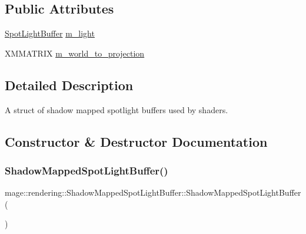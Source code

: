 \subsection*{Public Attributes}
\begin{DoxyCompactItemize}
\item 
\hyperlink{structmage_1_1rendering_1_1_spot_light_buffer}{Spot\+Light\+Buffer} \hyperlink{structmage_1_1rendering_1_1_shadow_mapped_spot_light_buffer_a1df0d45520394b125e77b806f1b6265d}{m\+\_\+light}
\item 
X\+M\+M\+A\+T\+R\+IX \hyperlink{structmage_1_1rendering_1_1_shadow_mapped_spot_light_buffer_abb736c590c4a6efff217e15ef8abec4a}{m\+\_\+world\+\_\+to\+\_\+projection}
\end{DoxyCompactItemize}


\subsection{Detailed Description}
A struct of shadow mapped spotlight buffers used by shaders. 

\subsection{Constructor \& Destructor Documentation}
\hypertarget{structmage_1_1rendering_1_1_shadow_mapped_spot_light_buffer_a88d393bc59e25f35d29e478de8c81c89}{}\label{structmage_1_1rendering_1_1_shadow_mapped_spot_light_buffer_a88d393bc59e25f35d29e478de8c81c89} 
\subsubsection{\texorpdfstring{Shadow\+Mapped\+Spot\+Light\+Buffer()}{ShadowMappedSpotLightBuffer()}\hspace{0.1cm}{\footnotesize\ttfamily [1/3]}}
{\footnotesize\ttfamily mage\+::rendering\+::\+Shadow\+Mapped\+Spot\+Light\+Buffer\+::\+Shadow\+Mapped\+Spot\+Light\+Buffer (\begin{DoxyParamCaption}{ }\end{DoxyParamCaption})\hspace{0.3cm}{\ttfamily [noexcept]}}

